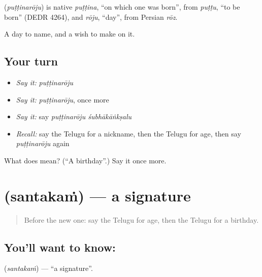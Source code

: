 \begin{cousinweb}
\textbf{} (\emph{puṭṭinarōju}) is native \emph{puṭṭina}, \textquotedblleft{}on which one was born\textquotedblright{}, from \emph{puṭṭu}, \textquotedblleft{}to be born\textquotedblright{} (DEDR 4264), and \emph{rōju}, \textquotedblleft{}day\textquotedblright{}, from Persian \emph{rōz}.
\end{cousinweb}

\begin{grammarlens}[title={What you've built}]
A day to name, and a wish to make on it.
\end{grammarlens}

\subsection*{Your turn}
\begin{itemize}
\raggedright
  \item \emph{Say it:} \emph{puṭṭinarōju}
  \item \emph{Say it:} \emph{puṭṭinarōju}, once more
  \item \emph{Say it:} say \emph{puṭṭinarōju śubhākāṅkṣalu}
  \item \emph{Recall:} say the Telugu for a nickname, then the Telugu for age, then say \emph{puṭṭinarōju} again
\end{itemize}

\begin{tcolorbox}[breakable,colback=teal!4,colframe=teal!35!black,title={Before you move on}]
What does  mean? (\textquotedblleft{}A birthday\textquotedblright{}.) Say it once more.
\end{tcolorbox}
\section[\texorpdfstring{\te{సంతకం} (santakaṁ)}{సంతకం (santakaṁ)}]{ (santakaṁ) — a signature}

\label{lesson:TE-C96-signature}



\begin{quote}
Before the new one: say the Telugu for age, then the Telugu for a birthday.
\end{quote}

\subsection*{You'll want to know: }
\textbf{} (\emph{santakaṁ}) — \textquotedblleft{}a signature\textquotedblright{}.

